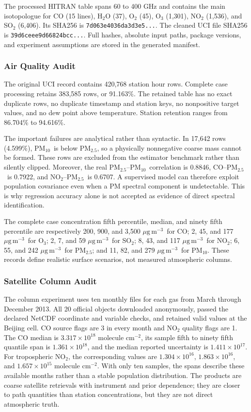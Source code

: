 \documentclass[conference]{IEEEtran}
\newcommand{\ugm}{\ensuremath{\mu\mathrm{g\,m}^{-3}}}
\newcommand{\pmfive}{PM$_{2.5}$}
\newcommand{\pmten}{PM$_{10}$}
\begin{document}
The processed HITRAN table spans 60 to 400 GHz and contains the main isotopologue for CO (15 lines), H$_2$O (37), O$_2$ (45), O$_3$ (1,301), NO$_2$ (1,536), and SO$_2$ (6,406). Its SHA256 is \texttt{7d063e4036da3d3e5...}. The cleaned UCI file SHA256 is \texttt{39d6ceee9d66824bcc...}. Full hashes, absolute input paths, package versions, and experiment assumptions are stored in the generated manifest.

\subsubsection{Air Quality Audit}

The original UCI record contains 420,768 station hour rows. Complete case processing retains 383,585 rows, or 91.163\%. The retained table has no exact duplicate rows, no duplicate timestamp and station keys, no nonpositive target values, and no dew point above temperature. Station retention ranges from 86.704\% to 94.616\%.

The important failures are analytical rather than syntactic. In 17,642 rows (4.599\%), \pmten\ is below \pmfive, so a physically nonnegative coarse mass cannot be formed. These rows are excluded from the estimator benchmark rather than silently clipped. Moreover, the real \pmfive--\pmten\ correlation is 0.8846, CO--\pmfive\ is 0.7922, and NO$_2$--\pmfive\ is 0.6707. A supervised model can therefore exploit population covariance even when a PM spectral component is undetectable. This is why regression accuracy alone is not accepted as evidence of direct spectral identification.

The complete case concentration fifth percentile, median, and ninety fifth percentile are respectively 200, 900, and 3,500 \ugm\ for CO; 2, 45, and 177 \ugm\ for O$_3$; 2, 7, and 59 \ugm\ for SO$_2$; 8, 43, and 117 \ugm\ for NO$_2$; 6, 55, and 242 \ugm\ for \pmfive; and 11, 82, and 279 \ugm\ for \pmten. These records define realistic surface scenarios, not measured atmospheric columns.

\subsubsection{Satellite Column Audit}

The column experiment uses ten monthly files for each gas from March through December 2013. All 20 official objects downloaded anonymously, passed the declared NetCDF coordinate and variable checks, and retained valid values at the Beijing cell. CO source flags are 3 in every month and NO$_2$ quality flags are 1. The CO median is $3.317\times10^{18}$ molecule cm$^{-2}$, its sample fifth to ninety fifth quantile span is $1.361\times10^{18}$, and the median reported uncertainty is $1.411\times10^{17}$. For tropospheric NO$_2$, the corresponding values are $1.304\times10^{16}$, $1.863\times10^{16}$, and $1.657\times10^{15}$ molecule cm$^{-2}$. With only ten samples, the spans describe these available months rather than a stable population distribution. The products are coarse satellite retrievals with instrument and prior dependence; they are closer to path quantities than station concentrations, but they are not direct atmospheric truth.
\end{document}
